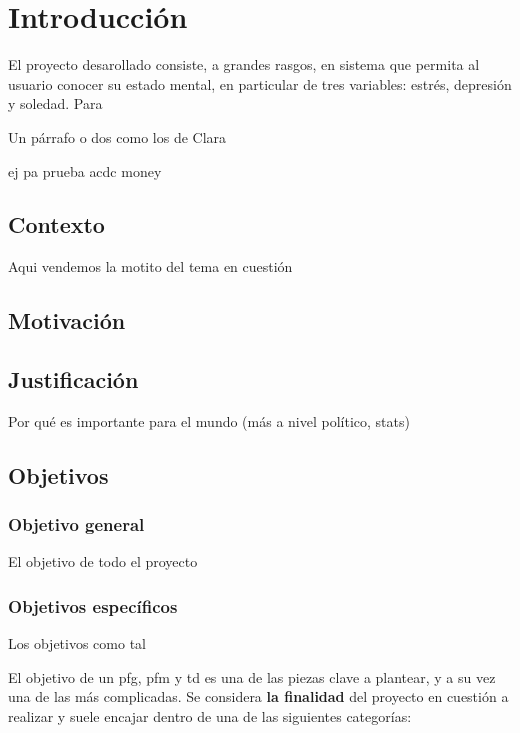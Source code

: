\chapter{Introducción}
\label{chapter:introduccion}


El proyecto desarollado consiste, a grandes rasgos, en sistema que permita al usuario conocer su estado mental, en 
particular de tres variables: estrés, depresión y soledad. Para


Un párrafo o dos como los de Clara

\gls{ej}
\gls{pa}
\gls{prueba}
\gls{acdc}
\gls{money}

\section{Contexto}

Aqui vendemos la motito del tema en cuestión

\section{Motivación}

\section{Justificación}

Por qué es importante para el mundo (más a nivel político, stats)

\section{Objetivos}

    \subsection{Objetivo general}

    El objetivo de todo el proyecto

    \subsection{Objetivos específicos}


    Los objetivos como tal


        El objetivo de un \gls{pfg}, \gls{pfm} y  \gls{td} es una de las piezas clave a plantear, y a su vez una de las más complicadas. Se considera \textbf{la finalidad} del proyecto en cuestión a realizar y suele encajar dentro de una de las siguientes categorías:

